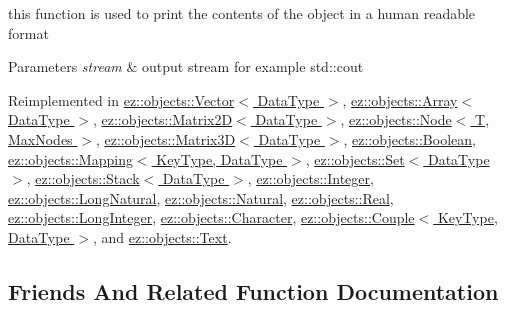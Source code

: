 this function is used to print the contents of the object in a human readable format 
\begin{DoxyParams}{Parameters}
{\em stream} & output stream for example std\+::cout \\
\hline
\end{DoxyParams}


Reimplemented in \hyperlink{classez_1_1objects_1_1Vector_a1c548586b93d57a8fa99e38167442f37}{ez\+::objects\+::\+Vector$<$ Data\+Type $>$}, \hyperlink{classez_1_1objects_1_1Array_a7f0707629712319837dc0cda091456b7}{ez\+::objects\+::\+Array$<$ Data\+Type $>$}, \hyperlink{classez_1_1objects_1_1Matrix2D_aeef806111fdd458dfcf1f09addd7a0b7}{ez\+::objects\+::\+Matrix2\+D$<$ Data\+Type $>$}, \hyperlink{classez_1_1objects_1_1Node_a56c80924a071a04d3fbb55c536efe293}{ez\+::objects\+::\+Node$<$ T, Max\+Nodes $>$}, \hyperlink{classez_1_1objects_1_1Matrix3D_a5e68194ecbc90039bf694377a579b59c}{ez\+::objects\+::\+Matrix3\+D$<$ Data\+Type $>$}, \hyperlink{classez_1_1objects_1_1Boolean_aeedca84417b36666eb237d8453b744b6}{ez\+::objects\+::\+Boolean}, \hyperlink{classez_1_1objects_1_1Mapping_ac30b4bf58f51ea49c8422dfce1e6cf15}{ez\+::objects\+::\+Mapping$<$ Key\+Type, Data\+Type $>$}, \hyperlink{classez_1_1objects_1_1Set_a6fd40ec895d19ec7ab00cc8c55b505a1}{ez\+::objects\+::\+Set$<$ Data\+Type $>$}, \hyperlink{classez_1_1objects_1_1Stack_a99dd22aaeedd73fb044aaf22c3cf12ac}{ez\+::objects\+::\+Stack$<$ Data\+Type $>$}, \hyperlink{classez_1_1objects_1_1Integer_a4d358be1f412fd702bd332cc4bf113bf}{ez\+::objects\+::\+Integer}, \hyperlink{classez_1_1objects_1_1LongNatural_a38b758c27edf31447f3bc65228900266}{ez\+::objects\+::\+Long\+Natural}, \hyperlink{classez_1_1objects_1_1Natural_ac841a61814757882ad7f2282be3ceb1c}{ez\+::objects\+::\+Natural}, \hyperlink{classez_1_1objects_1_1Real_ab41c52af3b10d8cd5190317fc1d70d85}{ez\+::objects\+::\+Real}, \hyperlink{classez_1_1objects_1_1LongInteger_a61530e285ac30d7890564a6cbe6bc283}{ez\+::objects\+::\+Long\+Integer}, \hyperlink{classez_1_1objects_1_1Character_abf2e9f190594d03005b1cd0610f2f38c}{ez\+::objects\+::\+Character}, \hyperlink{classez_1_1objects_1_1Couple_ab419858cd3ca8fa27f637ece04d52a97}{ez\+::objects\+::\+Couple$<$ Key\+Type, Data\+Type $>$}, and \hyperlink{classez_1_1objects_1_1Text_a3c101a7589871f8fd44117a9f13a159d}{ez\+::objects\+::\+Text}.



\subsection{Friends And Related Function Documentation}
\mbox{\label{classez_1_1objects_1_1Object_ade135c5015a5ee3d22d1cfd37c631603}} 
